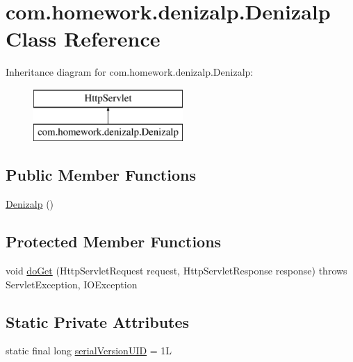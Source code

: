 \hypertarget{classcom_1_1homework_1_1denizalp_1_1_denizalp}{}\section{com.\+homework.\+denizalp.\+Denizalp Class Reference}
\label{classcom_1_1homework_1_1denizalp_1_1_denizalp}
Inheritance diagram for com.\+homework.\+denizalp.\+Denizalp\+:\begin{figure}[H]
\begin{center}
\leavevmode
\includegraphics[height=2.000000cm]{classcom_1_1homework_1_1denizalp_1_1_denizalp}
\end{center}
\end{figure}
\subsection*{Public Member Functions}
\begin{DoxyCompactItemize}
\item 
\hyperlink{classcom_1_1homework_1_1denizalp_1_1_denizalp_ae15225067faa1f6a5a42555e8e46d98e}{Denizalp} ()
\end{DoxyCompactItemize}
\subsection*{Protected Member Functions}
\begin{DoxyCompactItemize}
\item 
void \hyperlink{classcom_1_1homework_1_1denizalp_1_1_denizalp_a5ceb5e4e159bae7b8486d97db7ac8379}{do\+Get} (Http\+Servlet\+Request request, Http\+Servlet\+Response response)  throws Servlet\+Exception, I\+O\+Exception 
\end{DoxyCompactItemize}
\subsection*{Static Private Attributes}
\begin{DoxyCompactItemize}
\item 
static final long \hyperlink{classcom_1_1homework_1_1denizalp_1_1_denizalp_a0ba32279227f2b418ea1da8996859de8}{serial\+Version\+U\+ID} = 1L
\end{DoxyCompactItemize}


